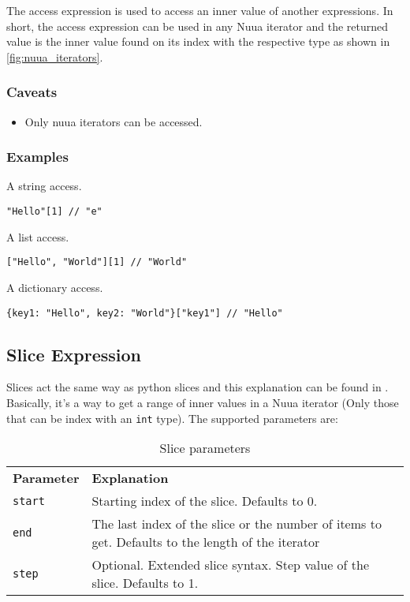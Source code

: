 The access expression is used to access an inner value of another expressions. In short, the access expression can be used in any
Nuua iterator and the returned value is the inner value found on its index with the respective type as shown in \autoref{fig:nuua_iterators}.

\subsubsection{Caveats}

\begin{itemize}
    \item Only nuua iterators can be accessed.
\end{itemize}

\subsubsection{Examples}

A string access.
\begin{lstlisting}
"Hello"[1] // "e"
\end{lstlisting}
A list access.
\begin{lstlisting}
["Hello", "World"][1] // "World"
\end{lstlisting}
A dictionary access.
\begin{lstlisting}
{key1: "Hello", key2: "World"}["key1"] // "Hello"
\end{lstlisting}

\subsection{Slice Expression}

Slices act the same way as python slices and this explanation can be found in \autocite{python_right_way}. Basically, it's a way to
get a range of inner values in a Nuua iterator (Only those that can be index with an \texttt{int} type).
The supported parameters are:

\begin{table}[H]
    \centering
    \begin{tabular}{ l p{7.5cm} }
        \textbf{Parameter} & \textbf{Explanation} \\
        \texttt{start} & Starting index of the slice. Defaults to 0.\\
        \texttt{end} & The last index of the slice or the number of items to get. Defaults to the length of the iterator\\
        \texttt{step} & Optional. Extended slice syntax. Step value of the slice. Defaults to 1.\\
    \end{tabular}
    \caption{Slice parameters}
    \label{fig:slice_parameters}
\end{table}

